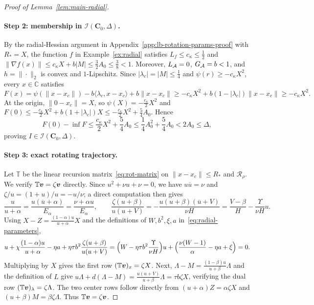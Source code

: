 \begin{proof}[Proof of Lemma~\ref{lem:main-radial}]
\paragraph{Step 2: membership in \(\mathcal I(\mathbf C_0,\Delta)\).}
By the radial-Hessian argument in Appendix~\ref{app:lb-rotation-params-proof}
with \(R_*=X\), the function \(f\) in Example~\ref{ex:radial} satisfies
\(L_f\le c_\kappa\le\frac12\) and
\(\|\nabla f(x)\|\le c_\kappa X+b|M|\le\frac32A_0\le\frac38<1\).
Moreover, \(L_{\mathcal{A}}=0\), \(G_{\mathcal{A}}=b<1\), and \(h=\|\cdot\|_2\) is convex
and \(1\)-Lipschitz. Since \(|\lambda_c|=|M|\le\frac14\) and
\(\psi(r)\ge-c_\kappa X^2\), every \(x\in\mathbb C\) satisfies
\[
F(x)=\psi(\|x-x_c\|)-b\langle\lambda_c,x-x_c\rangle+b\|x-x_c\|
\ge-c_\kappa X^2+b(1-|\lambda_c|)\|x-x_c\|\ge-c_\kappa X^2.
\]
At the origin, \(\|0-x_c\|=X\), so \(\psi(X)=-\frac{c_\kappa}{2}X^2\) and
\(F(0)\le-\frac{c_\kappa}{2}X^2+b(1+|\lambda_c|)X\le-\frac{c_\kappa}{2}X^2+\frac54A_0\).
Hence
\[
F(0)-\inf F\le\frac{c_\kappa}{2}X^2+\frac54A_0
\le\frac14A_0^2+\frac54A_0<2A_0\le\Delta,
\]
proving \(I\in\mathcal I(\mathbf C_0,\Delta)\).

\paragraph{Step 3: exact rotating trajectory.}
Let \(\mathbb T\) be the linear recursion matrix~\eqref{eq:rot-matrix} on
\(\|x-x_c\|\le R_*\) and \(\mathcal R_\rho\). We verify \(\mathbb T\bm{v}=\zeta\bm{v}\)
directly. Since \(u^2+\nu u+\nu=0\), we have \(u\overline u=\nu\) and
\(\zeta/u=(1+u)/u=-u/\nu\); a direct computation then gives
\[
\frac{u}{u+\alpha}=\frac{u(\overline u+\alpha)}{E_\alpha}=\frac{\nu+\alpha u}{E_\alpha},
\qquad
\frac{\zeta(u+\beta)}{u(u+V)}=-\frac{u(u+\beta)(\overline u+V)}{\nu H}
=\frac{V-\beta}{H}-\frac{\Upsilon}{\nu H}u.
\]
Using \(X-Z=\frac{(1-\alpha)u}{u+\alpha}X\) and the definitions of \(W,b^2,\xi,a\)
in~\eqref{eq:radial-parameters},
\[
u+\chi\frac{(1-\alpha)u}{u+\alpha}-\eta a+\eta\tau b^2\frac{\zeta(u+\beta)}{u(u+V)}
=\Bigl(W-\eta\tau b^2\frac{\Upsilon}{\nu H}\Bigr)u
 +\Bigl(\frac{\nu(W-1)}{\alpha}-\eta a+\xi\Bigr)=0.
\]
Multiplying by \(X\) gives the first row \((\mathbb T\bm{v})_x=\zeta X\). Next,
\(\Lambda-M=\frac{(1-\beta)u}{u+\beta}\Lambda\) and the definition of \(L\)
give \(u\Lambda+d(\Lambda-M)=\frac{u(u+V)}{u+\beta}\Lambda=\tau b\zeta X\),
verifying the dual row \((\mathbb T\bm{v})_\lambda=\zeta\Lambda\). The two center
rows follow directly from \((u+\alpha)Z=\alpha\zeta X\) and
\((u+\beta)M=\beta\zeta\Lambda\). Thus \(\mathbb T\bm{v}=\zeta\bm{v}\).


\end{proof}
